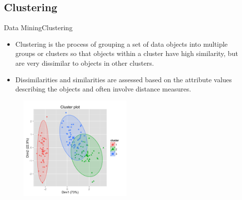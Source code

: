 \documentclass[10pt]{beamer}
\begin{document}
\subsection{Clustering}
\begin{frame}{Data Mining}{Clustering}

\begin{itemize}
\item Clustering is the process of grouping a set of data objects into multiple groups or clusters
so that objects within a cluster have high similarity, but are very dissimilar to objects in
other clusters.
\item Dissimilarities and similarities are assessed based on the attribute values describing the
objects and often involve distance measures.

\end{itemize}
\begin{figure}[H]
	\centering
	\includegraphics[width=0.5\textwidth]{images/clustering.png}

\end{figure}
\end{frame}
\end{document}
